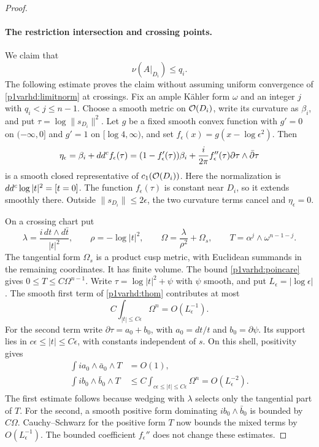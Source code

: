 \begin{proof}
\paragraph{The restriction intersection and crossing points.}
We claim that
\begin{equation}\label{p1varhd:restrictionrank}
                    \nu(A|_{D_i})\leq q_i.
\end{equation}
The following estimate proves the claim without assuming uniform
convergence of \eqref{p1varhd:limitnorm} at crossings.  Fix an ample
K\"ahler form $\omega$ and an integer $j$ with
$q_i<j\leq n-1$.  Choose a smooth metric on $\mathcal O(D_i)$, write its
curvature as $\beta_i$, and put
$\tau=\log\|s_{D_i}\|^2$.  Let $g$ be a fixed smooth convex
function with $g'=0$ on $(-\infty,0]$ and $g'=1$ on
$[\log4,\infty)$, and set
$f_\epsilon(x)=g(x-\log\epsilon^2)$.  Then
\begin{equation}\label{p1varhd:thom}
 \eta_\epsilon
  =\beta_i+dd^c f_\epsilon(\tau)
  =(1-f_\epsilon'(\tau))\beta_i
     +\frac{i}{2\pi}f_\epsilon''(\tau)
                   \partial\tau\wedge\bar\partial\tau
\end{equation}
is a smooth closed representative of $c_1(\mathcal O(D_i))$.
Here the normalization is $dd^c\log|t|^2=[t=0]$.
The function $f_\epsilon(\tau)$ is constant near $D_i$, so it
extends smoothly there.  Outside $\|s_{D_i}\|\leq2\epsilon$,
the two curvature terms cancel and $\eta_\epsilon=0$.

On a crossing chart put
\[
 \lambda=\frac{i\,dt\wedge d\bar t}{|t|^2},\qquad
 \rho=-\log|t|^2,\qquad
 \Omega=\frac{\lambda}{\rho^2}+\Omega_s,
 \qquad T=\alpha^j\wedge\omega^{n-1-j}.
\]
The tangential form $\Omega_s$ is a product cusp metric, with
Euclidean summands in the remaining coordinates.  It has finite
volume.  The bound \eqref{p1varhd:poincare} gives
$0\leq T\leq C\Omega^{n-1}$.
Write $\tau=\log|t|^2+\psi$ with $\psi$ smooth, and put
$L_\epsilon=|\log\epsilon|$.  The smooth first term of
\eqref{p1varhd:thom} contributes at most
\[
 C\int_{|t|\leq C\epsilon}\Omega^n
                     =O(L_\epsilon^{-1}).
\]
For the second term write $\partial\tau=a_0+b_0$, with
$a_0=dt/t$ and $b_0=\partial\psi$.  Its support lies in
$c\epsilon\leq|t|\leq C\epsilon$, with constants independent
of $s$.  On this shell, positivity gives
\begin{align*}
 \int i a_0\wedge\bar a_0\wedge T&=O(1),\\
 \int i b_0\wedge\bar b_0\wedge T
       &\leq C\int_{c\epsilon\leq|t|\leq C\epsilon}\Omega^n
         =O(L_\epsilon^{-2}).
\end{align*}
The first estimate follows because wedging with $\lambda$
selects only the tangential part of $T$.  For the second, a smooth
positive form dominating $i b_0\wedge\bar b_0$ is bounded by
$C\Omega$.  Cauchy--Schwarz for the positive form $T$ now bounds
the mixed terms by $O(L_\epsilon^{-1})$.
The bounded coefficient $f_\epsilon''$ does not change these
estimates.


\end{proof}
